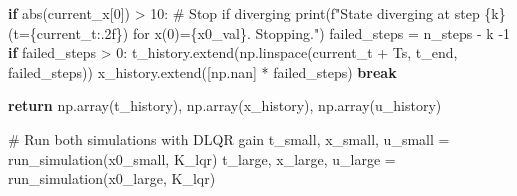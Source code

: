 \documentclass[
  letterpaper,
  DIV=11,
  numbers=noendperiod,
  oneside]{scrartcl}
\newenvironment{Shaded}{\begin{snugshade}}{\end{snugshade}}
\newcommand{\BuiltInTok}[1]{\textcolor[rgb]{0.00,0.23,0.31}{#1}}
\newcommand{\CommentTok}[1]{\textcolor[rgb]{0.37,0.37,0.37}{#1}}
\newcommand{\ControlFlowTok}[1]{\textcolor[rgb]{0.00,0.23,0.31}{\textbf{#1}}}
\newcommand{\DecValTok}[1]{\textcolor[rgb]{0.68,0.00,0.00}{#1}}
\newcommand{\NormalTok}[1]{\textcolor[rgb]{0.00,0.23,0.31}{#1}}
\newcommand{\OperatorTok}[1]{\textcolor[rgb]{0.37,0.37,0.37}{#1}}
\newcommand{\SpecialCharTok}[1]{\textcolor[rgb]{0.37,0.37,0.37}{#1}}
\newcommand{\SpecialStringTok}[1]{\textcolor[rgb]{0.13,0.47,0.30}{#1}}
\begin{document}
\begin{Shaded}
\begin{Highlighting}[numbers=left,,]
        \ControlFlowTok{if} \BuiltInTok{abs}\NormalTok{(current\_x[}\DecValTok{0}\NormalTok{]) }\OperatorTok{\textgreater{}} \DecValTok{10}\NormalTok{: }\CommentTok{\# Stop if diverging}
            \BuiltInTok{print}\NormalTok{(}\SpecialStringTok{f"State diverging at step }\SpecialCharTok{\{}\NormalTok{k}\SpecialCharTok{\}}\SpecialStringTok{ (t=}\SpecialCharTok{\{}\NormalTok{current\_t}\SpecialCharTok{:.2f\}}\SpecialStringTok{) for x(0)=}\SpecialCharTok{\{}\NormalTok{x0\_val}\SpecialCharTok{\}}\SpecialStringTok{. Stopping."}\NormalTok{)}
\NormalTok{            failed\_steps }\OperatorTok{=}\NormalTok{ n\_steps }\OperatorTok{{-}}\NormalTok{ k }\OperatorTok{{-}}\DecValTok{1}
            \ControlFlowTok{if}\NormalTok{ failed\_steps }\OperatorTok{\textgreater{}} \DecValTok{0}\NormalTok{:}
\NormalTok{                 t\_history.extend(np.linspace(current\_t }\OperatorTok{+}\NormalTok{ Ts, t\_end, failed\_steps))}
\NormalTok{                 x\_history.extend([np.nan] }\OperatorTok{*}\NormalTok{ failed\_steps)}
            \ControlFlowTok{break}

    \ControlFlowTok{return}\NormalTok{ np.array(t\_history), np.array(x\_history), np.array(u\_history)}

\CommentTok{\# Run both simulations with DLQR gain}
\NormalTok{t\_small, x\_small, u\_small }\OperatorTok{=}\NormalTok{ run\_simulation(x0\_small, K\_lqr)}
\NormalTok{t\_large, x\_large, u\_large }\OperatorTok{=}\NormalTok{ run\_simulation(x0\_large, K\_lqr)}


\end{Highlighting}
\end{Shaded}
\end{document}
